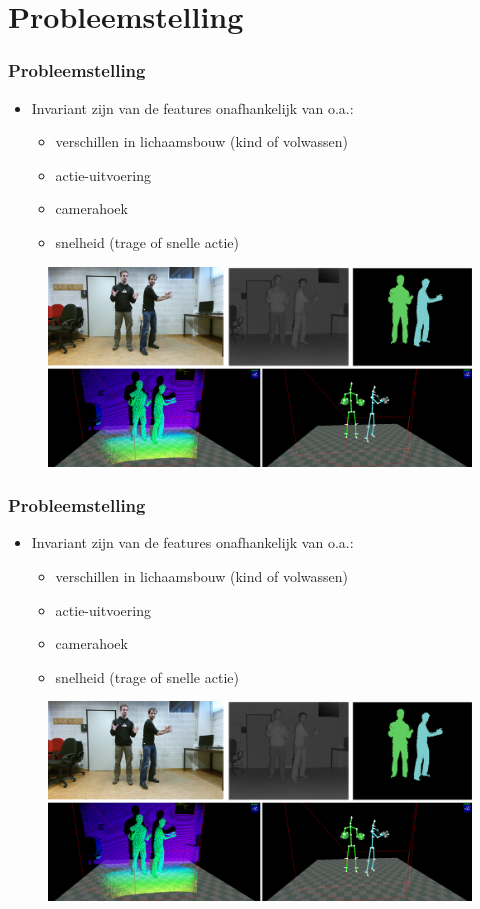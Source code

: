 \documentclass[]{beamer}
\begin{document}
	\section{Probleemstelling}
	\begin{frame}
		\frametitle{Probleemstelling}
		\begin{itemize}
			\item Invariant zijn van de features onafhankelijk van o.a.:
			\begin{itemize}
				\item verschillen in lichaamsbouw (kind of volwassen)
				\item actie-uitvoering
				\item camerahoek
				\item snelheid (trage of snelle actie)
			\end{itemize}
		\end{itemize}
		\begin{figure}
			\includegraphics[width=0.7\linewidth]{sensoren}
		\end{figure}
	\end{frame}
	\begin{frame}
			\frametitle{Probleemstelling}
	\begin{itemize}
		\item Invariant zijn van de features onafhankelijk van o.a.:
		\begin{itemize}
			\item verschillen in lichaamsbouw (kind of volwassen)
			\item actie-uitvoering
			\item camerahoek
			\item snelheid (trage of snelle actie)
		\end{itemize}
	\end{itemize}
	\begin{figure}
		\includegraphics[width=0.7\linewidth]{sensoren}
	\end{figure}
	\end{frame}
\end{document}
